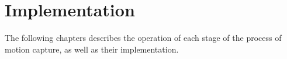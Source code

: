\section{Implementation}\label{implementacionPosta}
The following chapters describes the operation of each stage of the process of motion capture, as well as their implementation.



